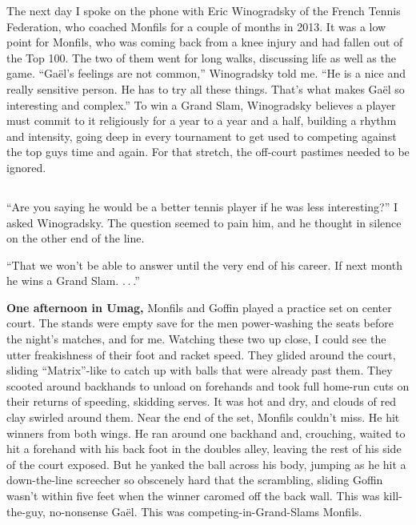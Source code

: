 The next day I spoke on the phone with Eric Winogradsky of the French
Tennis Federation, who coached Monfils for a couple of months in 2013.
It was a low point for Monfils, who was coming back from a knee injury
and had fallen out of the Top 100. The two of them went for long walks,
discussing life as well as the game. ``Gaël's feelings are not common,''
Winogradsky told me. ``He is a nice and really sensitive person. He has
to try all these things. That's what makes Gaël so interesting and
complex.'' To win a Grand Slam, Winogradsky believes a player must
commit to it religiously for a year to a year and a half, building a
rhythm and intensity, going deep in every tournament to get used to
competing against the top guys time and again. For that stretch, the
off-court pastimes needed to be ignored.

\hypertarget{-1}{%
\subsection{}\label{-1}}

``Are you saying he would be a better tennis player if he was less
interesting?'' I asked Winogradsky. The question seemed to pain him, and
he thought in silence on the other end of the line.

``That we won't be able to answer until the very end of his career. If
next month he wins a Grand Slam. . . .''

\textbf{One afternoon in Umag,} Monfils and Goffin played a practice set
on center court. The stands were empty save for the men power-washing
the seats before the night's matches, and for me. Watching these two up
close, I could see the utter freakishness of their foot and racket
speed. They glided around the court, sliding ``Matrix''-like to catch up
with balls that were already past them. They scooted around backhands to
unload on forehands and took full home-run cuts on their returns of
speeding, skidding serves. It was hot and dry, and clouds of red clay
swirled around them. Near the end of the set, Monfils couldn't miss. He
hit winners from both wings. He ran around one backhand and, crouching,
waited to hit a forehand with his back foot in the doubles alley,
leaving the rest of his side of the court exposed. But he yanked the
ball across his body, jumping as he hit a down-the-line screecher so
obscenely hard that the scrambling, sliding Goffin wasn't within five
feet when the winner caromed off the back wall. This was kill-the-guy,
no-nonsense Gaël. This was competing-in-Grand-Slams Monfils.

